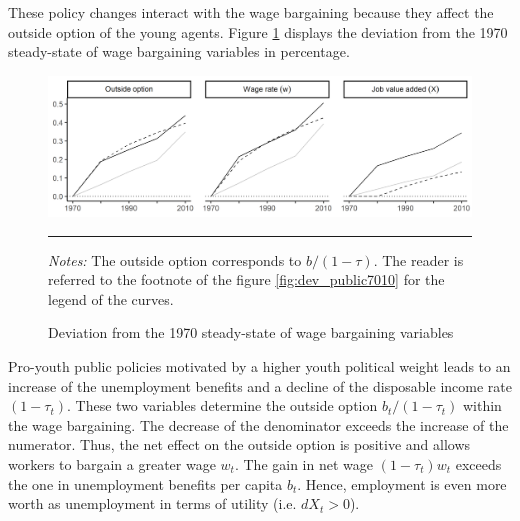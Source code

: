 
These policy changes interact with the wage bargaining because they affect the outside option of the young agents. Figure \ref{fig:dev_bargain7010} displays the deviation from the 1970 steady-state of wage bargaining variables in percentage.
\begin{figure}[tb]
	\centering
	\includegraphics[width=1\linewidth]{../result/deviation/dev_bargain7010.png}
	\caption{Deviation from the 1970 steady-state of wage bargaining variables}
	\label{fig:dev_bargain7010}
	\vspace{.5ex}
	\hrule
	\vspace{-4ex}
	\justify\singlespacing\footnotesize \textit{Notes:} The outside option corresponds to $b/(1-\tau)$. The reader is referred to the footnote of the figure \ref{fig:dev_public7010} for the legend of the curves.
\end{figure}
Pro-youth public policies motivated by a higher youth political weight leads to an increase of the unemployment benefits and a decline of the disposable income rate $(1-\tau_t)$. These two variables determine the outside option $b_t/(1-\tau_t)$ within the wage bargaining. The decrease of the denominator exceeds the increase of the numerator. Thus, the net effect on the outside option is positive and allows workers to bargain a greater wage $w_t$. The gain in net wage $(1-\tau_t)w_t$ exceeds the one in unemployment benefits per capita $b_t$. Hence, employment is even more worth as unemployment in terms of utility (i.e. $dX_t > 0$).

